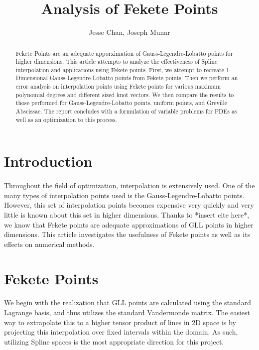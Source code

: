 \documentclass{article}
\title{Analysis of Fekete Points}
\author{Jesse Chan, Joseph Munar}
\date{}
\begin{document}
\maketitle
\nopagebreak
\begin{abstract}
Fekete Points are an adequate apporximation of Gauss-Legendre-Lobatto points for higher dimensions. This article attempts to analyze the effectiveness of Spline interpolation and applications using Fekete points. First, we attempt to recreate 1-Dimensional Gauss-Legendre-Lobatto points from Fekete points. Then we perform an error analysis on interpolation points using Fekete points for various maximum polynomial degrees and different sized knot vectors. We then compare the results to those performed for Gauss-Legendre-Lobatto points, uniform points, and Greville Abscissae. The report concludes with a formulation of variable problems for PDEs as well as an optimization to this process.
\end{abstract}
\section*{Introduction}
\paragraph{}
Throughout the field of optimization, interpolation is extensively used. One of the many types of interpolation points used is the Gauss-Legendre-Lobatto points. However, this set of interpolation points becomes expensive very quickly and very little is known about this set in higher dimensions. Thanks to *insert cite here*, we know that Fekete points are adequate approximations of GLL points in higher dimensions. This article investigates the usefulness of Fekete points as well as its effects on numerical methods.

\section*{Fekete Points}
\paragraph{}
We begin with the realization that GLL points are calculated using the standard Lagrange basis, and thus utilizes the standard Vandermonde matrix. The easiest way to extrapolate this to a higher tensor product of lines in 2D space is by projecting this interpolation over fixed intervals within the domain. As such, utilizing Spline spaces is the most appropriate direction for this project.
\end{document}

